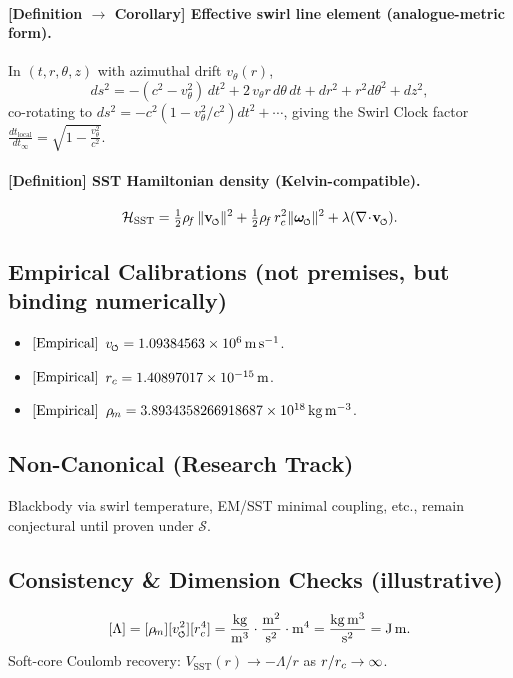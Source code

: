 \documentclass[11pt]{article}
\begin{document}
    \paragraph{[Definition \(\to\) Corollary] Effective swirl line element (analogue-metric form).}
    In \((t,r,\theta,z)\) with azimuthal drift \(v_\theta(r)\),
    \[
        ds^2=-(c^2-v_\theta^2)\,dt^2+2\,v_\theta r\,d\theta\,dt+dr^2+r^2d\theta^2+dz^2,
    \]
    co-rotating to \(ds^2=-c^2(1-v_\theta^2/c^2)dt^2+\cdots\), giving the Swirl Clock factor
    \(\displaystyle \frac{dt_{\text{local}}}{dt_\infty}=\sqrt{1-\frac{v_\theta^2}{c^2}}\).

    \paragraph{[Definition] SST Hamiltonian density (Kelvin-compatible).}
    \[
        \mathcal{H}_{\text{SST}}=\tfrac12\rhof\,\|\vswirl\|^2+\tfrac12\rhof\,\rc^2\|\omegas\|^2+\lambda(\nabla\!\cdot\!\vswirl).
    \]

    \subsection*{Empirical Calibrations (not premises, but binding numerically)}
    \begin{itemize}
        \item \([{\rm Empirical}]\) \(\vscore = 1.09384563\times 10^6\,\mathrm{m\,s^{-1}}\).
        \item \([{\rm Empirical}]\) \(r_c = 1.40897017\times 10^{-15}\,\mathrm{m}\).
        \item \([{\rm Empirical}]\) \(\rho_{\!m} = 3.8934358266918687\times 10^{18}\,\mathrm{kg\,m^{-3}}\).
    \end{itemize}

    \subsection*{Non-Canonical (Research Track)}
    Blackbody via swirl temperature, EM/SST minimal coupling, etc., remain conjectural until proven under \(\mathcal{S}\).

    \subsection*{Consistency \& Dimension Checks (illustrative)}
    \[
        [\Lambda]=[\rhom][\vscore^2][\rc^4]
        =\frac{\mathrm{kg}}{\mathrm{m^3}}\cdot\frac{\mathrm{m^2}}{\mathrm{s^2}}\cdot\mathrm{m^4}
        =\frac{\mathrm{kg\,m^3}}{\mathrm{s^2}}
        =\mathrm{J\,m}.
    \]
    Soft-core Coulomb recovery: \(V_{\text{SST}}(r)\to -\Lambda/r\) as \(r/r_c\to\infty\).
\end{document}
